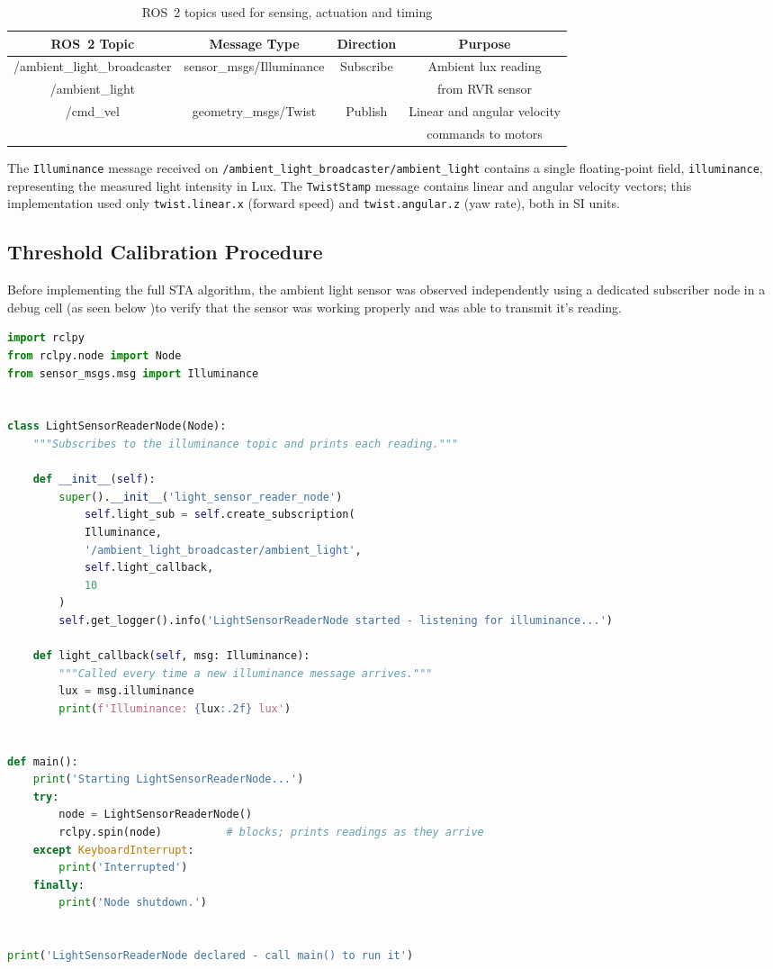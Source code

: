 \documentclass[11 pt , a 4 paper ]{article}
\theoremstyle{definition}
\begin{document}
	\begin{center}
		\begin{table}[hbt!]
			\label{ROS}
			\vskip 5pt
			\centering\begin{tabular}{|c|c|c|c|}
			\hline
				\textbf{ROS~2 Topic} & \textbf{Message Type} & \textbf{Direction} & \textbf{Purpose}\\
				\hline
					    /ambient\_light\_broadcaster &
					sensor\_msgs/Illuminance &
					Subscribe &
					Ambient lux reading  \\
					/ambient\_light&&&from RVR sensor\\
					\hline
					    /cmd\_vel &
					geometry\_msgs/Twist &
					Publish &
					Linear and angular velocity  \\
					&&&commands to motors\\
					\hline
			\end{tabular}
			\caption{ROS~2 topics used for sensing, actuation and timing}
		\end{table}
	\end{center}

\noindent The \texttt{Illuminance} message received on \texttt{/ambient\_light\_broadcaster/ambient\_light} contains a single floating-point field, \texttt{illuminance}, representing the measured light intensity in Lux. The \texttt{TwistStamp} message contains linear and angular velocity vectors; this implementation used only \texttt{twist.linear.x} (forward speed) and \texttt{twist.angular.z} (yaw rate), both in SI units.
\subsection{Threshold Calibration Procedure}
Before implementing the full STA algorithm, the ambient light sensor was observed independently using a dedicated subscriber node in a debug cell (as seen below )to verify that the sensor was working properly and was able to transmit it's reading. 
\begin{lstlisting}[language=python]import rclpy
from rclpy.node import Node
from sensor_msgs.msg import Illuminance


class LightSensorReaderNode(Node):
	"""Subscribes to the illuminance topic and prints each reading."""

	def __init__(self):
		super().__init__('light_sensor_reader_node')
			self.light_sub = self.create_subscription(
			Illuminance,
			'/ambient_light_broadcaster/ambient_light',
			self.light_callback,
			10
		)
		self.get_logger().info('LightSensorReaderNode started - listening for illuminance...')
	
	def light_callback(self, msg: Illuminance):
		"""Called every time a new illuminance message arrives."""
		lux = msg.illuminance
		print(f'Illuminance: {lux:.2f} lux')


def main():
	print('Starting LightSensorReaderNode...')
	try:
		node = LightSensorReaderNode()
		rclpy.spin(node)          # blocks; prints readings as they arrive
	except KeyboardInterrupt:
		print('Interrupted')
	finally:
		print('Node shutdown.')


print('LightSensorReaderNode declared - call main() to run it')

\end{lstlisting}
\end{document}
